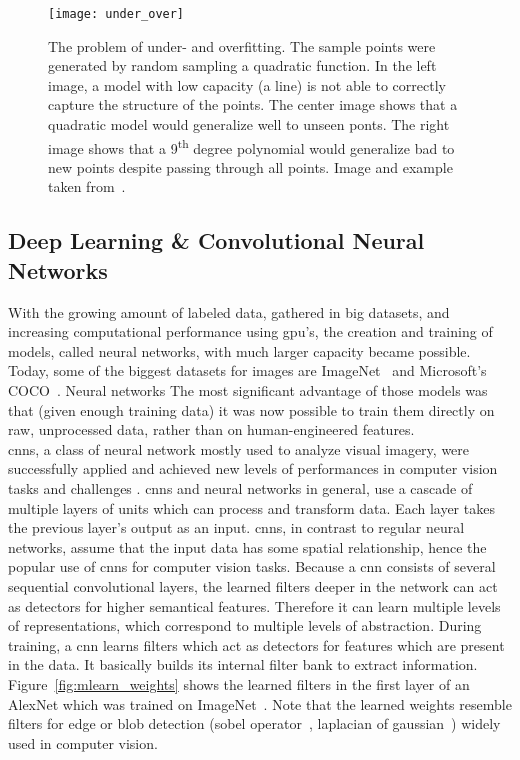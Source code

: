\begin{figure}[htbp]
    \centering
	\texttt{[image: under\_over]}
    \caption[Under- and Overfitting]{The problem of under- and overfitting. The sample points were generated by random sampling a quadratic function. In the left image, a model with low capacity (a line) is not able to correctly capture the structure of the points. The center image shows that a quadratic model would generalize well to unseen ponts. The right image shows that a 9\textsuperscript{th} degree polynomial would generalize bad to new points despite passing through all points. Image and example taken from~\cite{Goodfellow2016DeepLearning}.}
    \label{fig:under_over_fitting}
\end{figure}

\subsection{Deep Learning \& Convolutional Neural Networks}
With the growing amount of labeled data, gathered in big datasets, and increasing computational performance using \gls{gpu}'s, the creation and training of models, called neural networks, with much larger capacity became possible. Today, some of the biggest datasets for images are ImageNet~\cite{Russakovsky2015ImageNetChallenge} and Microsoft's COCO~\cite{Lin2014MicrosoftContext}.
Neural networks
The most significant advantage of those models was that (given enough training data) it was now possible to train them directly on raw, unprocessed data, rather than on human-engineered features.\\
\gls{cnn}s, a class of neural network mostly used to analyze visual imagery, were successfully applied \cite{Lecun2015DeepLearning} and achieved new levels of performances in computer vision tasks and challenges \cite{Krizhevsky2012ImageNetNetworks,Simonyan2014VeryRecognition,Szegedy2014GoingConvolutions,He2015DeepRecognition,Zeiler2014VisualizingNetworks}. 
\gls{cnn}s and neural networks in general, use a cascade of multiple layers of units which can process
and transform data. Each layer takes the previous layer's output as an input. \gls{cnn}s, in contrast to regular neural networks, assume that the input data has some spatial relationship, hence the popular use of \gls{cnn}s for computer vision tasks. Because a \gls{cnn} consists of several sequential convolutional layers, the learned filters deeper in the network can act as detectors for higher semantical features. Therefore it can learn multiple levels of representations, which correspond to multiple levels of abstraction. During training, a \gls{cnn} learns filters which act as detectors for features which are present in the data. It basically builds its internal filter bank to extract information. Figure~\ref{fig:mlearn_weights} shows the learned filters in the first layer of an AlexNet which was trained on ImageNet~\cite{Russakovsky2015ImageNetChallenge}. Note that the learned weights resemble filters for edge or blob detection (sobel operator~\cite{Sobel1990AnOperator}, laplacian of gaussian~\cite{Marr187}) widely used in computer vision.\\

